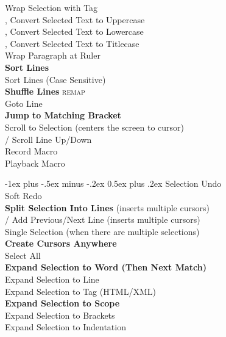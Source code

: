 \documentclass[10pt,landscape]{article}
\makeatletter
\renewcommand{\section}{\@startsection{section}{1}{0mm}%
                                {-1ex plus -.5ex minus -.2ex}%
                                {0.5ex plus .2ex}%
                                {\normalfont\large\bfseries}}
\makeatother
\begin{document}
\begin{multicols}{3}
 Wrap Selection with Tag \\
,  Convert Selected Text to Uppercase \\
,  Convert Selected Text to Lowercase \\
,  Convert Selected Text to Titlecase \\
 Wrap Paragraph at Ruler \\
 \textbf{Sort Lines} \\
 Sort Lines (Case Sensitive) \\
 \textbf{Shuffle Lines} \textsc{remap} \\
 Goto Line \\
 \textbf{Jump to Matching Bracket} \\
 Scroll to Selection (centers the screen to cursor) \\
\keys{\ctrl+\Alt+\arrowkeyup}/\keys{\arrowkeydown} Scroll Line Up/Down \\
 Record Macro \\
 Playback Macro

\section{Selection}
 Undo \\
 Soft Redo \\
 \textbf{Split Selection Into Lines} (inserts multiple cursors) \\
\keys{\ctrl+\shift+\arrowkeyup}/\keys{\arrowkeydown} Add Previous/Next Line (inserts multiple cursors) \\
\keys{\esc} Single Selection (when there are multiple selections) \\
 \textbf{Create Cursors Anywhere} \\
 Select All \\
 \textbf{Expand Selection to Word (Then Next Match)} \\
 Expand Selection to Line \\
 Expand Selection to Tag (HTML/XML) \\
\keys{\cmd+\shift+\space} \textbf{Expand Selection to Scope} \\
 Expand Selection to Brackets \\
 Expand Selection to Indentation \\


\end{multicols}
\end{document}
